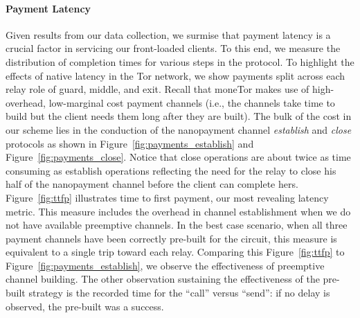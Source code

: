

\paragraph*{Payment Latency}
Given results from our data collection, we surmise that payment latency is a
crucial factor in servicing our front-loaded clients. To this end, we measure
the distribution of completion times for various steps in the protocol. To
highlight the effects of native latency in the Tor network, we show payments
split across each relay role of guard, middle, and exit. Recall that moneTor
makes use of high-overhead, low-marginal cost payment channels (i.e., the
channels take time to build but the client needs them long after they are
built). The bulk of the cost in our scheme lies in the conduction of the
nanopayment channel \emph{establish} and \emph{close} protocols as shown in
Figure~\ref{fig:payments_establish} and Figure~\ref{fig:payments_close}. Notice
that close operations are about twice as time consuming as establish operations
reflecting the need for the relay to close his half of the nanopayment channel
before the client can complete hers. Figure~\ref{fig:ttfp} illustrates time to
first payment, our most revealing latency metric. This measure includes the
overhead in channel establishment when we do not have available preemptive
channels. In the best case scenario, when all three payment channels have been
correctly pre-built for the circuit, this measure is equivalent to a single trip
toward each relay. Comparing this Figure~\ref{fig:ttfp} to
Figure~\ref{fig:payments_establish}, we observe the effectiveness of preemptive
channel building. The other observation sustaining the effectiveness of the
pre-built strategy is the recorded time for the ``call'' versus ``send'': if no
delay is observed, the pre-built was a success.

